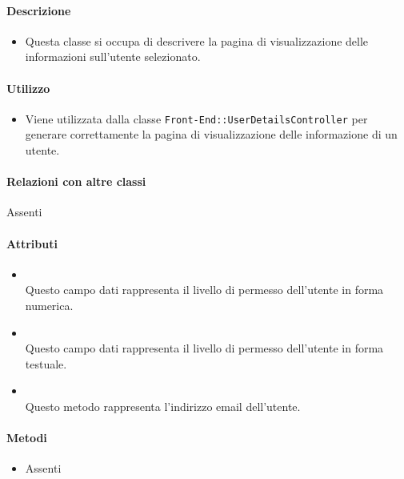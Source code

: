 \paragraph*{Descrizione}
\begin{itemize}
\item[] Questa classe si occupa di descrivere la pagina di visualizzazione delle informazioni sull'utente selezionato.
\end{itemize}

\paragraph*{Utilizzo}
\begin{itemize}
\item[] Viene utilizzata dalla classe \texttt{Front-End::UserDetailsController} per generare correttamente la pagina di visualizzazione delle informazione di un utente.
\end{itemize}

\paragraph*{Relazioni con altre classi}
Assenti

\paragraph*{Attributi}
\begin{itemize}
\item[]  \\ Questo campo dati rappresenta il livello di permesso dell'utente in forma numerica.
\item[]  \\ Questo campo dati rappresenta il livello di permesso dell'utente in forma testuale.
\item[]  \\ Questo metodo rappresenta l'indirizzo email dell'utente.
\end{itemize}

\paragraph*{Metodi}
\begin{itemize}
\item[] Assenti
\end{itemize}

